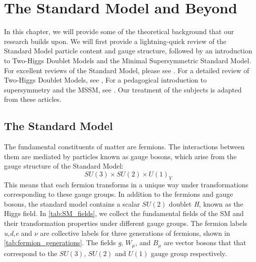 \chapter{The Standard Model and Beyond}\label{ch:theory}

\newcommand{\ct}{\cos\theta_w}
\newcommand{\st}{\sin\theta_w}

In this chapter, we will provide some of the theoretical background that our research builds upon. We will first provide a lightning-quick review of the Standard Model particle content and gauge structure, followed by an introduction to Two-Higgs Doublet Models and the Minimal Supersymmetric Standard Model. For excellent reviews of the Standard Model, please see \citep{Cheng1985,Schwartz2014,Zee2010,Peskin:1995ev}. For a detailed review of Two-Higgs Doublet Models, see  \cite{Branco2012}, For a pedagogical introduction to supersymmetry and the MSSM, see \cite{Martin1997}. Our treatment of the subjects is adapted from these articles. 

\section{The Standard Model}\label{sec:sm}

The fundamental constituents of matter are fermions. The interactions between them are mediated by particles known as gauge bosons, which arise from the gauge structure of the Standard Model:
\[SU(3)\times SU(2)\times U(1)_Y\]
This means that each fermion transforms in a unique way under transformations corresponding to these gauge groups. In addition to the fermions and gauge bosons, the standard model contains a scalar $SU(2)$ doublet \emph{H}, known as the Higgs field. In \autoref{tab:SM_fields}, we collect the fundamental fields of the SM and their transformation properties under different gauge groups. The fermion labels \emph{u,d,e} and $\nu$ are collective labels for three generations of fermions, shown in \autoref{tab:fermion_generations}. The fields \emph{g}, $W_\mu$, and $B_\mu$ are vector bosons that that correspond to the $SU(3)$, $SU(2)$ and $U(1)$ gauge group respectively.

